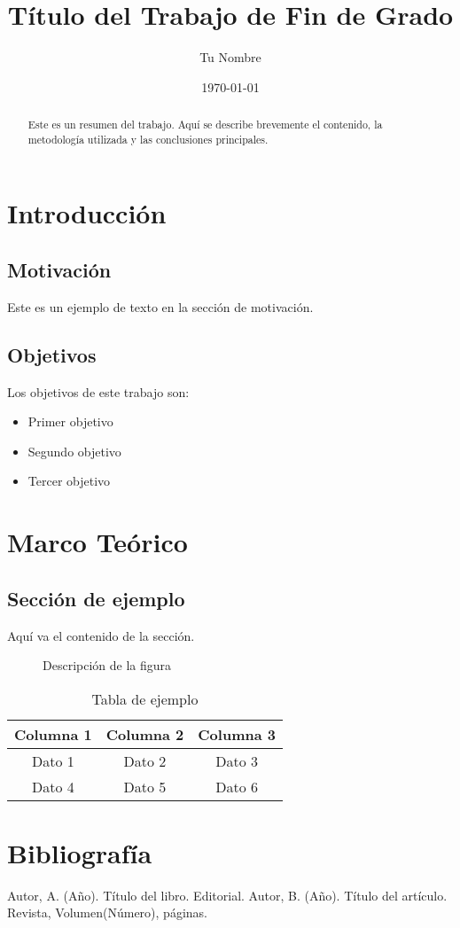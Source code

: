 \documentclass[12pt,a4paper]{report}
\title{Título del Trabajo de Fin de Grado}
\author{Tu Nombre}
\date{\today}
\begin{document}
\maketitle

\begin{abstract}
Este es un resumen del trabajo. Aquí se describe brevemente el contenido, 
la metodología utilizada y las conclusiones principales.
\end{abstract}

\tableofcontents
\newpage

\chapter{Introducción}
\section{Motivación}
Este es un ejemplo de texto en la sección de motivación.

\section{Objetivos}
Los objetivos de este trabajo son:
\begin{itemize}
    \item Primer objetivo
    \item Segundo objetivo
    \item Tercer objetivo
\end{itemize}

\chapter{Marco Teórico}
\section{Sección de ejemplo}
Aquí va el contenido de la sección.

\begin{figure}[h]
    \centering
    \caption{Descripción de la figura}
    \label{fig:ejemplo}
\end{figure}

\begin{table}[h]
    \centering
    \caption{Tabla de ejemplo}
    \begin{tabular}{|c|c|c|}
        \hline
        Columna 1 & Columna 2 & Columna 3 \\
        \hline
        Dato 1 & Dato 2 & Dato 3 \\
        Dato 4 & Dato 5 & Dato 6 \\
        \hline
    \end{tabular}
    \label{tab:ejemplo}
\end{table}

\chapter{Bibliografía}
\begin{thebibliography}{99}
     Autor, A. (Año). Título del libro. Editorial.
     Autor, B. (Año). Título del artículo. Revista, Volumen(Número), páginas.
\end{thebibliography}
\end{document}

